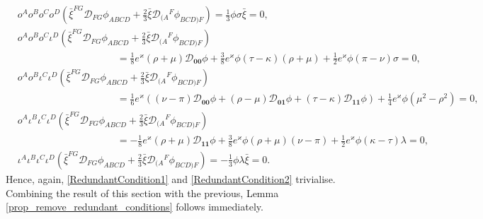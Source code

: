 \documentclass[10pt,a4paper]{article}
\theoremstyle{plain}
\begin{document}
\begin{align*}
& o^Ao^Bo^Co^D(\bar{\xi}^{FG}\mathcal{D}_{FG}\phi_{ABCD} + \tfrac{2}{3} \bar{\xi} \mathcal{D}_{(A}{}^{F}\phi_{BCD)F})  =\tfrac{1}{3} \phi \sigma  \bar{\xi} =0,\\
& o^Ao^Bo^C\iota^D(\bar{\xi}^{FG}\mathcal{D}_{FG}\phi_{ABCD} + \tfrac{2}{3} \bar{\xi} \mathcal{D}_{(A}{}^{F}\phi_{BCD)F}) \\
&\qquad\qquad\qquad\qquad\qquad = \tfrac{1}{8} e^{\varkappa} (\rho+\mu) \mathcal{D}_{\bm0\bm0}\phi + \tfrac{3}{8}e^{\varkappa}\phi  (\tau - \kappa)(\rho+\mu)  +  \tfrac{1}{2} e^{\varkappa}\phi(\pi-\nu) \sigma   = 0	,\\
& o^Ao^B\iota^C\iota^D(\bar{\xi}^{FG}\mathcal{D}_{FG}\phi_{ABCD} + \tfrac{2}{3} \bar{\xi} \mathcal{D}_{(A}{}^{F}\phi_{BCD)F})  \\
&\qquad\qquad\qquad\qquad\qquad=	\tfrac{1}{6} e^{\varkappa}\left((\nu-\pi)\mathcal{D}_{\bm0\bm0}\phi + (\rho-\mu)\mathcal{D}_{\bm0\bm1}\phi + (\tau-\kappa)\mathcal{D}_{\bm1\bm1}\phi \right)  + \tfrac{1}{4} e^{\varkappa} \phi(\mu^2-\rho^2) = 0,\\
& o^A\iota^B\iota^C\iota^D(\bar{\xi}^{FG}\mathcal{D}_{FG}\phi_{ABCD} + \tfrac{2}{3} \bar{\xi} \mathcal{D}_{(A}{}^{F}\phi_{BCD)F})  \\
& \qquad\qquad\qquad\qquad\qquad =	- \tfrac{1}{8} e^{\varkappa}  (\rho+\mu) \mathcal{D}_{\bm1\bm1}\phi  +  \tfrac{3}{8} e^{\varkappa} \phi(\rho+\mu) (\nu-\pi) + \tfrac{1}{2} e^{\varkappa}\phi (\kappa-\tau) \lambda    = 0,\\
& \iota^A\iota^B\iota^C\iota^D(\bar{\xi}^{FG}\mathcal{D}_{FG}\phi_{ABCD} + \tfrac{2}{3} \bar{\xi} \mathcal{D}_{(A}{}^{F}\phi_{BCD)F})  =	- \tfrac{1}{3}\phi \lambda \bar{\xi} = 0.
\end{align*}
Hence, again, \eqref{RedundantCondition1} and \eqref{RedundantCondition2} trivialise. Combining the result of this section with the previous, Lemma \ref{prop_remove_redundant_conditions} follows immediately.


% 
% 
\end{document}
